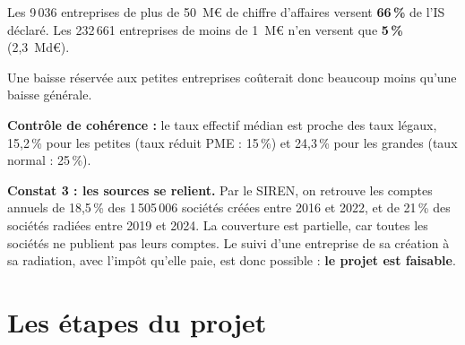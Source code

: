 \documentclass[11pt,a4paper]{article}
\begin{document}
\begin{minipage}[c]{0.56\textwidth}
\end{minipage}\hfill
\begin{minipage}[c]{0.4\textwidth}
\small
Les 9\,036 entreprises de plus de 50~M€ de chiffre d'affaires versent \textbf{66\,\%} de l'IS déclaré.
Les 232\,661 entreprises de moins de 1~M€ n'en versent que \textbf{5\,\%} (2,3~Md€).

Une baisse réservée aux petites entreprises coûterait donc beaucoup moins qu'une baisse générale.

\textbf{Contrôle de cohérence :} le taux effectif médian est proche des taux légaux,
15,2\,\% pour les petites (taux réduit PME : 15\,\%) et 24,3\,\% pour les grandes (taux normal : 25\,\%).
\end{minipage}

\textbf{Constat 3 : les sources se relient.}
Par le SIREN, on retrouve les comptes annuels de 18,5\,\% des 1\,505\,006 sociétés créées entre 2016 et 2022,
et de 21\,\% des sociétés radiées entre 2019 et 2024. La couverture est partielle, car toutes les sociétés ne publient
pas leurs comptes. Le suivi d'une entreprise de sa création à sa radiation, avec l'impôt qu'elle paie, est donc possible :
\textbf{le projet est faisable}.

\section{Les étapes du projet}
\end{document}
